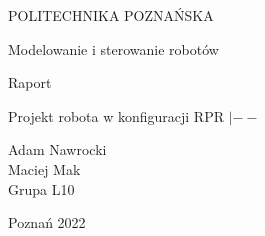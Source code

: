 \begin{titlepage}
	\begin{center}
	\fontsize{28pt}{28pt}\selectfont
	
POLITECHNIKA POZNAŃSKA

	
  \vspace*{12mm}
	
		\fontsize{24pt}{24pt}\selectfont

Modelowanie i sterowanie robotów
	
	 \vspace*{10mm}
	
\begin{figure}[!htb]
\centering
  \label{fig:PPLogo}
\end{figure} 
	

	\vspace*{10mm}

	
	\fontsize{24pt}{24pt}\selectfont
	Raport \\
	

		\fontsize{14pt}{14pt}\selectfont
	\vspace*{10mm}


	\vspace*{5mm}
	\fontsize{22pt}{22pt}\selectfont
	Projekt robota w konfiguracji RPR $|--$
	\vspace*{10mm}
	\fontsize{16pt}{16pt}\selectfont

Adam Nawrocki\\ Maciej Mak\\

	\vspace*{5mm}
	\fontsize{13pt}{13pt}\selectfont
	Grupa L10

 \fontsize{16pt}{16pt}\selectfont
	\vspace*{10mm}
	Poznań 2022
	\end{center}
\end{titlepage}
